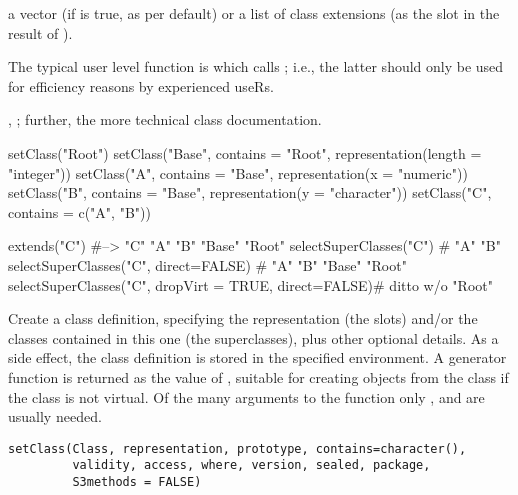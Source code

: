 %
\begin{Value}
a  vector (if  is true, as per
default) or a list of class extensions (as the  slot in
the result of ).
\end{Value}
%
\begin{Note}\relax
The typical user level function is 
which calls ; i.e., the latter should only
be used for efficiency reasons by experienced useRs.
\end{Note}
%
\begin{SeeAlso}\relax
{}, ; further, the more technical
class  documentation.
\end{SeeAlso}
%
\begin{Examples}
\begin{ExampleCode}
setClass("Root")
setClass("Base", contains = "Root", representation(length = "integer"))
setClass("A", contains = "Base", representation(x = "numeric"))
setClass("B", contains = "Base", representation(y = "character"))
setClass("C", contains = c("A", "B"))

extends("C")   #-->  "C"  "A" "B"  "Base" "Root"
selectSuperClasses("C") # "A" "B"
selectSuperClasses("C", direct=FALSE) # "A" "B"  "Base"  "Root"
selectSuperClasses("C", dropVirt = TRUE, direct=FALSE)# ditto w/o "Root"
\end{ExampleCode}
\end{Examples}
%
\begin{Description}\relax
Create  a class definition, specifying the representation (the
slots) and/or the classes contained in this one (the superclasses),
plus other optional details.  As a side effect, the class definition
is stored in the specified environment.  A generator function
is returned as the value of , suitable for creating
objects from the class if the class is not virtual.  Of the many
arguments to the function only ,
 and  are usually needed.
\end{Description}
%
\begin{Usage}
\begin{verbatim}
setClass(Class, representation, prototype, contains=character(),
         validity, access, where, version, sealed, package,
         S3methods = FALSE)
\end{verbatim}
\end{Usage}

